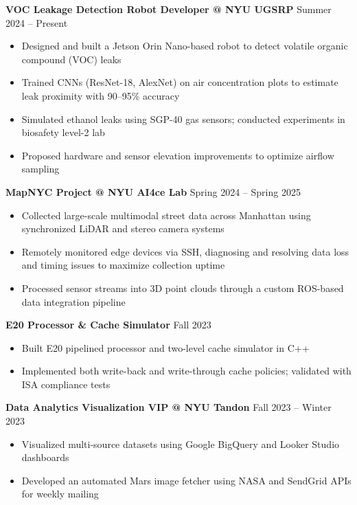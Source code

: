 \documentclass[letterpaper,10pt]{article}
\begin{document}
\textbf{VOC Leakage Detection Robot Developer @ NYU UGSRP} \hfill Summer 2024 – Present
\begin{itemize}[leftmargin=*]
	\item Designed and built a Jetson Orin Nano-based robot to detect volatile organic compound (VOC) leaks
	\item Trained CNNs (ResNet-18, AlexNet) on air concentration plots to estimate leak proximity with 90–95\% accuracy
	\item Simulated ethanol leaks using SGP-40 gas sensors; conducted experiments in biosafety level-2 lab
	\item Proposed hardware and sensor elevation improvements to optimize airflow sampling
\end{itemize}

\textbf{MapNYC Project @ NYU AI4ce Lab} \hfill Spring 2024 – Spring 2025  
\begin{itemize}[leftmargin=*]
    \item Collected large-scale multimodal street data across Manhattan using synchronized LiDAR and stereo camera systems
    \item Remotely monitored edge devices via SSH, diagnosing and resolving data loss and timing issues to maximize collection uptime
    \item Processed sensor streams into 3D point clouds through a custom ROS-based data integration pipeline
\end{itemize}


\textbf{E20 Processor \& Cache Simulator} \hfill Fall 2023
\begin{itemize}[leftmargin=*]
	\item Built E20 pipelined processor and two-level cache simulator in C++
	\item Implemented both write-back and write-through cache policies; validated with ISA compliance tests
\end{itemize}

\textbf{Data Analytics Visualization VIP @ NYU Tandon} \hfill Fall 2023 – Winter 2023
\begin{itemize}[leftmargin=*]
	\item Visualized multi-source datasets using Google BigQuery and Looker Studio dashboards
	\item Developed an automated Mars image fetcher using NASA and SendGrid APIs for weekly mailing
\end{itemize}

\end{document}
